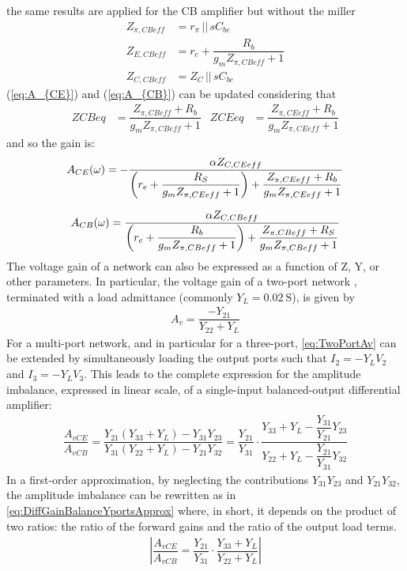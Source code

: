 \noindent
the same results are applied for the CB amplifier but without the miller
\begin{align}
    Z_{\pi,CBeff}&= r_{\pi} \, || \, sC_{be}\\
    Z_{E,CBeff} &= r_e+\dfrac{R_b}{g_m  Z_{\pi,CBeff}+1}\\
    Z_{C,CBeff}  &= Z_C\, || \, sC_{bc}
\end{align}
\noindent
(\ref{eq:A_{CE}}) and (\ref{eq:A_{CB}}) can be updated considering that
\begin{align}
    ZCBeq&=\dfrac{Z_{\pi,CBeff}+R_b}{g_mZ_{\pi,CBeff}+1} & ZCEeq&=\dfrac{Z_{\pi,CEeff}+R_b}{g_mZ_{\pi,CEeff}+1}
\end{align}
and so the gain is:
\begin{equation}
    A_{CE}(\omega)=-\dfrac{\alpha Z_{C,CEeff}}{\left(r_e+\dfrac{R_S}{g_m Z_{\pi,CEeff}+1}\right)+\dfrac{Z_{\pi,CEeff}+R_b}{g_m Z_{\pi,CEeff}+1}}
    \label{eq:A_{CEeff}}
\end{equation}


\begin{equation}
    A_{CB}(\omega)=\dfrac{\alpha Z_{C,CBeff}}{\left(r_e+\dfrac{R_b}{g_m Z_{\pi,CBeff}+1}\right)+\dfrac{Z_{\pi,CBeff}+R_S}{g_m Z_{\pi,CBeff}+1}}
    \label{eq:A_{CBeff}}
\end{equation}
\cleardoublepage
\noindent
 The voltage gain of a network can also be expressed as a function of Z, Y, or other parameters. In particular, the voltage gain of a two-port network \cite{High-Frequency Integrated Circuits}, terminated with a load admittance (commonly $Y_L=\SI{0.02}{\siemens}$), is given by
\begin{align}
    A_v=\dfrac{-Y_{21}}{Y_{22}+Y_L}
    \label{eq:TwoPortAv}
\end{align}
For a multi-port network, and in particular for a three-port, \eqref{eq:TwoPortAv} can be extended by simultaneously loading the output ports such that $I_2=-Y_LV_2$ and $I_3=-Y_LV_3$. This leads to the complete expression for the amplitude imbalance, expressed in linear scale, of a single-input balanced-output differential amplifier:
\begin{align}
    \dfrac{A_{vCE}}{A_{vCB}}
    =
    \dfrac{Y_{21}\left(Y_{33}+Y_L\right)-Y_{31}Y_{23}}
    {Y_{31}\left(Y_{22}+Y_L\right)-Y_{21}Y_{32}}=
    \dfrac{Y_{21}}{Y_{31}}\cdot\dfrac{Y_{33}+Y_L-\dfrac{Y_{31}}{Y_{21}}Y_{23}}{Y_{22}+Y_L-\dfrac{Y_{21}}{Y_{31}}Y_{32}}
    \label{eq:DiffGainBalanceYportsComplete}
\end{align}
In a first-order approximation, by neglecting the contributions $Y_{31}Y_{23}$ and $Y_{21}Y_{32}$, the amplitude imbalance can be rewritten as in \eqref{eq:DiffGainBalanceYportsApprox} where, in short, it depends on the product of two ratios: the ratio of the forward gains and the ratio of the output load terms.
\begin{align}
    \left| \dfrac{A_{vCE}}{A_{vCB}}=\dfrac{Y_{21}}{Y_{31}}\cdot\dfrac{Y_{33}+Y_L}{Y_{22}+Y_L}\right|
    \label{eq:DiffGainBalanceYportsApprox}
\end{align}

